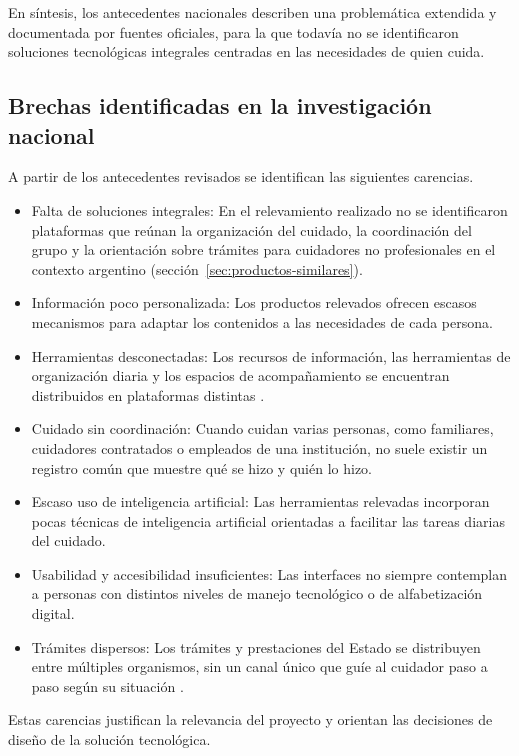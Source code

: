 En síntesis, los antecedentes nacionales describen una problemática extendida y documentada por fuentes oficiales, para la que todavía no se identificaron soluciones tecnológicas integrales centradas en las necesidades de quien cuida.

\subsection{Brechas identificadas en la investigación nacional}

A partir de los antecedentes revisados se identifican las siguientes carencias.

\begin{itemize}
    \item Falta de soluciones integrales: En el relevamiento realizado no se identificaron plataformas que reúnan la organización del cuidado, la coordinación del grupo y la orientación sobre trámites para cuidadores no profesionales en el contexto argentino (sección~\ref{sec:productos-similares}).
    \item Información poco personalizada: Los productos relevados ofrecen escasos mecanismos para adaptar los contenidos a las necesidades de cada persona.
    \item Herramientas desconectadas: Los recursos de información, las herramientas de organización diaria y los espacios de acompañamiento se encuentran distribuidos en plataformas distintas \citep{senadis}.
    \item Cuidado sin coordinación: Cuando cuidan varias personas, como familiares, cuidadores contratados o empleados de una institución, no suele existir un registro común que muestre qué se hizo y quién lo hizo.
    \item Escaso uso de inteligencia artificial: Las herramientas relevadas incorporan pocas técnicas de inteligencia artificial orientadas a facilitar las tareas diarias del cuidado.
    \item Usabilidad y accesibilidad insuficientes: Las interfaces no siempre contemplan a personas con distintos niveles de manejo tecnológico o de alfabetización digital.
    \item Trámites dispersos: Los trámites y prestaciones del Estado se distribuyen entre múltiples organismos, sin un canal único que guíe al cuidador paso a paso según su situación \citep{senadis}.
\end{itemize}

Estas carencias justifican la relevancia del proyecto y orientan las decisiones de diseño de la solución tecnológica.

